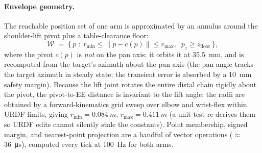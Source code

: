 \paragraph{Envelope geometry.}
The reachable position set of one arm is approximated by an annulus around
the shoulder-lift pivot plus a table-clearance floor:
\begin{equation}
  \mathcal{W} \;=\; \bigl\{\,p \;:\; r_{\min}\le \lVert p - c(p)\rVert \le
  r_{\max}, \;\; p_z \ge z_{\mathrm{floor}} \,\bigr\},
  \label{eq:envelope}
\end{equation}
where the pivot \(c(p)\) is \emph{not} on the pan axis: it orbits it at
\SI{35.5}{mm}, and is recomputed from the target's azimuth about the pan
axis (the pan angle tracks the target azimuth in steady state; the
transient error is absorbed by a \SI{10}{mm} safety margin). Because the
lift joint rotates the entire distal chain rigidly about the pivot, the
pivot-to-EE distance is invariant to the lift angle; the radii are obtained
by a forward-kinematics grid sweep over elbow and wrist-flex within URDF
limits, giving \(r_{\min}=\SI{0.084}{m}\), \(r_{\max}=\SI{0.411}{m}\) (a
unit test re-derives them so URDF edits cannot silently stale the
constants). Point membership, signed margin, and nearest-point projection
are a handful of vector operations (\(\approx\)\SI{36}{\micro s}), computed
every tick at \SI{100}{Hz} for both arms.

